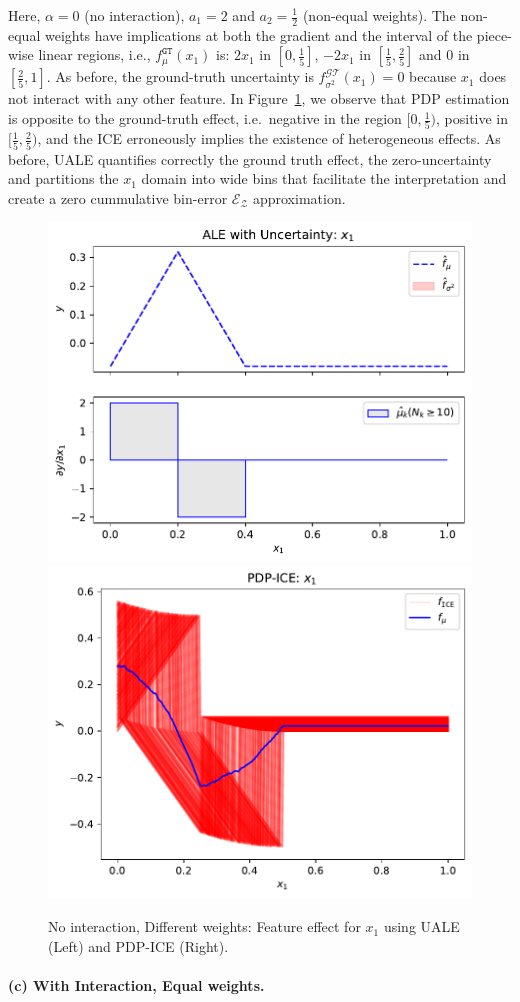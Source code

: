 \documentclass[twoside]{article}
\begin{document}
Here, \(\alpha=0\) (no interaction), \(a_1 = 2\) and
\(a_2= \frac{1}{2}\) (non-equal weights). The non-equal weights have
implications at both the gradient and the interval of the piece-wise
linear regions, i.e., \(f_\mu^{\mathtt{GT}}(x_1)\) is: \(2x_1\) in
\([0, \frac{1}{5}]\), \(-2x_1\) in \([\frac{1}{5}, \frac{2}{5}]\) and
\(0\) in \([\frac{2}{5}, 1]\). As before, the ground-truth uncertainty
is \(f^{\mathcal{GT}}_{\sigma^2}(x_1) = 0\) because \(x_1\) does not
interact with any other feature. In Figure~\ref{fig:ex-synth-1-2}, we
observe that PDP estimation is opposite to the ground-truth effect,
i.e.~negative in the region \([0, \frac{1}{5})\), positive in
\([\frac{1}{5}, \frac{2}{5})\), and the ICE erroneously implies the
existence of heterogeneous effects. As before, UALE quantifies
correctly the ground truth effect, the zero-uncertainty and partitions
the \(x_1\) domain into wide bins that facilitate the interpretation
and create a zero cummulative bin-error \(\mathcal{E}_{\mathcal{Z}}\)
approximation.

\begin{figure}[h]
  \centering
  \includegraphics[width=.23\textwidth]{example_2/dale_feat_0.pdf}
  \includegraphics[width=.23\textwidth]{example_2/pdp_ice_feat_0.pdf}
  \caption{No interaction, Different weights: Feature effect for \(x_1\)
    using UALE (Left) and PDP-ICE (Right).}
  \label{fig:ex-synth-1-2}
\end{figure}

\paragraph{(c) With Interaction, Equal weights.}
\end{document}
